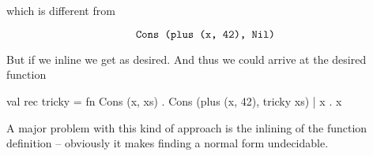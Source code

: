 which is different from

\[
\texttt{Cons (plus (x, 42), Nil)}
\]

But if we inline  we get  as desired. And thus we could
arrive at the desired function

\begin{sml}
val rec tricky =
fn Cons (x, xs)  . Cons (plus (x, 42), tricky xs)
 | x             . x
\end{sml}

A major problem with this kind of approach is the inlining of the function
definition -- obviously it makes finding a normal form undecidable.

